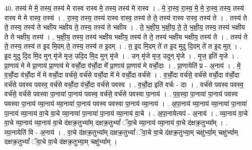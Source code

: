\documentclass[17pt]{extarticle}
\begin{document}
40. तस्य॑ मे मे॒ तस्य॒ तस्य॑ मे रास्व रास्व मे॒ तस्य॒ तस्य॑ मे रास्व । . मे॒ रा॒स्व॒ रा॒स्व॒ मे॒ मे॒ रा॒स्व॒ तस्य॒ तस्य॑ रास्व मे मे रास्व॒ तस्य॑ । . रा॒स्व॒ तस्य॒ तस्य॑ रास्व रास्व॒ तस्य॑ ते ते॒ तस्य॑ रास्व रास्व॒ तस्य॑ ते । . तस्य॑ ते ते॒ तस्य॒ तस्य॑ ते भक्षीय भक्षीय ते॒ तस्य॒ तस्य॑ ते भक्षीय । . ते॒ भ॒क्षी॒य॒ भ॒क्षी॒य॒ ते॒ ते॒ भ॒क्षी॒य॒ तस्य॒ तस्य॑ भक्षीय ते ते भक्षीय॒ तस्य॑ । . भ॒क्षी॒य॒ तस्य॒ तस्य॑ भक्षीय भक्षीय॒ तस्य॑ ते ते॒ तस्य॑ भक्षीय भक्षीय॒ तस्य॑ ते । . तस्य॑ ते ते॒ तस्य॒ तस्य॑ त इ॒द मि॒दम् ते॒ तस्य॒ तस्य॑ त इ॒दम् । . त॒ इ॒द मि॒दम् ते॑ त इ॒द मुदु दि॒दम् ते॑ त इ॒द मुत् । . इ॒द मुदु दि॒द मि॒द मुन् मृ॑जे मृज॒ उदि॒द मि॒द मुन् मृ॑जे । . उन् मृ॑जे मृज॒ उदुन् मृ॑जे । . मृ॒ज॒ इति॑ मृजे । . प्रा॒णाय॑ मे मे प्रा॒णाय॑ प्रा॒णाय॑ मे वर्चो॒दा व॑र्चो॒दा मे᳚ प्रा॒णाय॑ प्रा॒णाय॑ मे वर्चो॒दाः । . प्रा॒णायेति॑ प्र - अ॒नाय॑ । . मे॒ व॒र्चो॒दा व॑र्चो॒दा मे॑ मे वर्चो॒दा वर्च॑से॒ वर्च॑से वर्चो॒दा मे॑ मे वर्चो॒दा वर्च॑से । . व॒र्चो॒दा वर्च॑से॒ वर्च॑से वर्चो॒दा व॑र्चो॒दा वर्च॑से पवस्व पवस्व॒ वर्च॑से वर्चो॒दा व॑र्चो॒दा वर्च॑से पवस्व । . व॒र्चो॒दा इति॑ वर्चः - दाः । . वर्च॑से पवस्व पवस्व॒ वर्च॑से॒ वर्च॑से पवस्वा पा॒नाया॑ पा॒नाय॑ पवस्व॒ वर्च॑से॒ वर्च॑से पवस्वा पा॒नाय॑ । . प॒व॒स्वा॒ पा॒नाया॑ पा॒नाय॑ पवस्व पवस्वा पा॒नाय॑ व्या॒नाय॑ व्या॒नाया॑ पा॒नाय॑ पवस्व पवस्वा पा॒नाय॑ व्या॒नाय॑ । . अ॒पा॒नाय॑ व्या॒नाय॑ व्या॒नाया॑ पा॒नाया॑ पा॒नाय॑ व्या॒नाय॑ वा॒चे वा॒चे व्या॒नाया॑ पा॒नाया॑ पा॒नाय॑ व्या॒नाय॑ वा॒चे । . अ॒पा॒नायेत्यप॑ - अ॒नाय॑ । . व्या॒नाय॑ वा॒चे वा॒चे व्या॒नाय॑ व्या॒नाय॑ वा॒चे द॑क्षक्र॒तुभ्या᳚म् दक्षक्र॒तुभ्यां᳚ ॅवा॒चे व्या॒नाय॑ व्या॒नाय॑ वा॒चे द॑क्षक्र॒तुभ्या᳚म् । . व्या॒नायेति॑ वि - अ॒नाय॑ । . वा॒चे द॑क्षक्र॒तुभ्या᳚म् दक्षक्र॒तुभ्यां᳚ ॅवा॒चे वा॒चे द॑क्षक्र॒तुभ्या॒म् चक्षु॑र्भ्या॒म् चक्षु॑र्भ्याम् दक्षक्र॒तुभ्यां᳚ ॅवा॒चे वा॒चे द॑क्षक्र॒तुभ्या॒म् चक्षु॑र्भ्याम् । \newline
\pagebreak
{}
\end{document}
